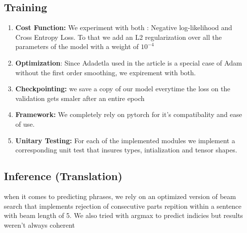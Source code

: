 \subsection{Training}

\begin{enumerate}
    \item \textbf{Cost Function:} We experiment with both : Negative log-likelihood and Cross Entropy Loss. To that we add an L2 regularization over all the parameters of the model with a weight of $10^{-4}$
    
    \item \textbf{Optimization}: Since Adadetla used in the article is a special case of Adam without the first order smoothing, we expirement with both.
    
    \item \textbf{Checkpointing:} we save a copy of our model everytime the loss on the validation gets smaler after an entire epoch

    \item \textbf{Framework:} We completely rely on pytorch for it's compatibality and ease of use. 
    
    \item  \textbf{Unitary Testing:} For each of the implemented modules we implement a corresponding unit test that insures types, intialization and tensor shapes. 
    
\end{enumerate}

\subsection{Inference (Translation)}

when it comes to predicting phrases, we rely on an optimized version of beam search that implements rejection of consecutive parts repition within a sentence with beam length of 5.
We also tried with argmax to predict indicies but results weren't always coherent

